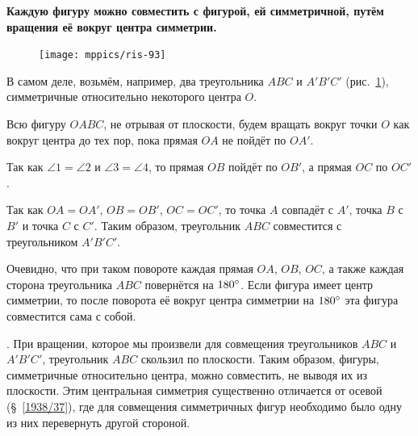 \documentclass[oneside]{book}
\begin{document}
\textbf{Каждую фигуру можно совместить с фигурой, ей симметричной, путём вращения её вокруг центра симметрии.}

\begin{figure}
\centering
\texttt{[image: mppics/ris-93]}
\caption{}\label{1938/ris-93}
\end{figure}

В самом деле, возьмём, например, два треугольника $ABC$ и $A'B'C'$ (рис.~\ref{1938/ris-93}), симметричные относительно некоторого центра $O$.

Всю фигуру $OABC$, не отрывая от плоскости, будем вращать вокруг точки $O$ как вокруг центра до тех пор, пока прямая $OA$ не пойдёт по $OA'$.

Так как $\angle 1 = \angle 2$ и $\angle 3 = \angle 4$, то прямая $OB$ пойдёт по $OB'$, а прямая $OC$ по $OC'$.

Так как $OA = OA'$, $OB=OB'$, $OC=OC'$, то точка $A$ совпадёт с $A'$, точка $B$ с $B'$ и точка $C$ с $C'$.
Таким образом, треугольник $ABC$ совместится с треугольником $A'B'C'$.

Очевидно, что при таком повороте каждая прямая $OA$, $OB$, $OC$, а также каждая сторона треугольника $ABC$ повернётся на $180\degree$.
Если фигура имеет центр симметрии, то после поворота её вокруг центра симметрии на $180\degree$ эта фигура совместится сама с собой.

.
При вращении, которое мы произвели для совмещения треугольников $ABC$ и $A'B'C'$, треугольник $ABC$ скользил по плоскости.
Таким образом, фигуры, симметричные относительно центра, можно совместить, не выводя их из плоскости.
Этим центральная симметрия существенно отличается от осевой (§~\ref{1938/37}), где для совмещения симметричных фигур необходимо было одну из них перевернуть другой стороной.
\end{document}

